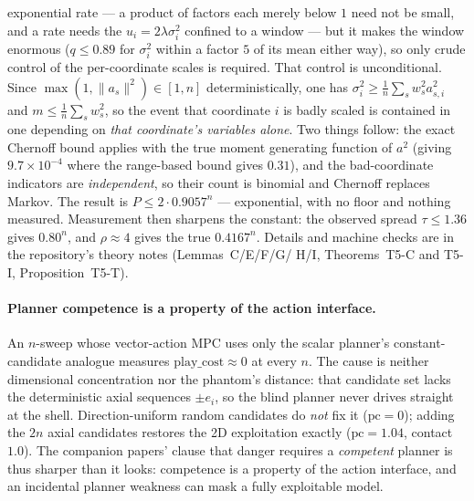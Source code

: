 \documentclass[11pt]{article}
\theoremstyle{remark}
\begin{document}
exponential rate --- a product of factors each merely below $1$ need
not be small, and a rate needs the $u_i = 2\lambda\sigma_i^2$ confined
to a window --- but it makes the window enormous ($q \le 0.89$ for
$\sigma_i^2$ within a factor $5$ of its mean either way), so only crude
control of the per-coordinate scales is required. That control is unconditional. Since
$\max(1,\lVert a_s\rVert^2) \in [1, n]$ deterministically, one has
$\sigma_i^2 \ge \tfrac1n\sum_s w_s^2 a_{s,i}^2$ and
$m \le \tfrac1n \sum_s w_s^2$, so the event that coordinate $i$ is
badly scaled is contained in one depending on \emph{that coordinate's
variables alone}. Two things follow: the exact Chernoff bound applies
with the true moment generating function of $a^2$ (giving
$9.7 \times 10^{-4}$ where the range-based bound gives $0.31$), and the
bad-coordinate indicators are \emph{independent}, so their count is
binomial and Chernoff replaces Markov. The result is
$P \le 2 \cdot 0.9057^n$ --- exponential, with no floor and nothing
measured. Measurement then sharpens the constant: the observed spread
$\tau \le 1.36$ gives $0.80^n$, and $\rho \approx 4$ gives the true
$0.4167^n$. Details
and machine checks are in the repository's theory notes (Lemmas~C/E/F/G/
H/I, Theorems~T5-C and T5-I, Proposition~T5-T).

\paragraph{Planner competence is a property of the action interface.}
An $n$-sweep whose vector-action
MPC uses only the scalar planner's constant-candidate analogue measures
$\mathrm{play\_cost} \approx 0$ at every $n$. The cause is neither
dimensional concentration nor the phantom's distance: that candidate set
lacks the deterministic axial sequences $\pm e_i$, so the blind planner
never drives straight at the shell. Direction-uniform random candidates do
\emph{not} fix it ($\mathrm{pc} = 0$); adding the $2n$ axial candidates
restores the 2D exploitation exactly ($\mathrm{pc} = 1.04$, contact
$1.0$). The companion papers' clause that danger requires a \emph{competent}
planner is thus sharper than it looks: competence is a property of the
action interface, and an incidental planner weakness can mask a fully
exploitable model.
\end{document}
